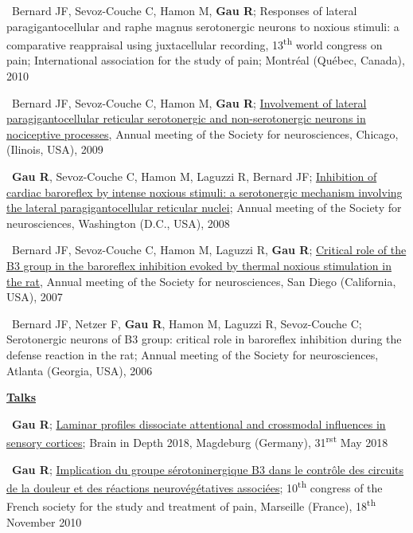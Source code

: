 \documentclass[a4paper,12pt,oneside]{letter}
\begin{document}
{\textbullet~Bernard JF, Sevoz-Couche C, Hamon M, \textbf{Gau R}; Responses of lateral paragigantocellular and raphe magnus serotonergic neurons to noxious stimuli: a comparative reappraisal using juxtacellular recording, 13\textsuperscript{th} world congress on pain; International association for the study of pain; Montréal (Québec, Canada), 2010

\textbullet~Bernard JF, Sevoz-Couche C, Hamon M, \textbf{Gau R}; \href{https://osf.io/efqub/}{Involvement of lateral paragigantocellular reticular serotonergic and non-serotonergic neurons in nociceptive processes}, Annual meeting of the Society for neurosciences, Chicago, (Ilinois, USA), 2009

\textbullet~\textbf{Gau R}, Sevoz-Couche C, Hamon M, Laguzzi R, Bernard JF; \href{https://osf.io/hxkgv/}{Inhibition of cardiac baroreflex by intense noxious stimuli: a serotonergic mechanism involving the lateral paragigantocellular reticular nuclei}; Annual meeting of the Society for neurosciences, Washington (D.C., USA), 2008

\textbullet~Bernard JF, Sevoz-Couche C, Hamon M, Laguzzi R, \textbf{Gau R}; \href{https://osf.io/4rjst/}{Critical role of the B3 group in the baroreflex inhibition evoked by thermal noxious stimulation in the rat}, Annual meeting of the Society for neurosciences, San Diego (California, USA), 2007

\textbullet~Bernard JF, Netzer F, \textbf{Gau R}, Hamon M, Laguzzi R, Sevoz-Couche C; Serotonergic neurons of B3 group: critical role in baroreflex inhibition during the defense reaction in the rat; Annual meeting of the Society for neurosciences, Atlanta (Georgia, USA), 2006


\begin{center}
 \href{https://osf.io/4h63t/}{\large\textbf{Talks}}
\end{center}

\textbullet~\textbf{Gau R}; \href{https://figshare.com/s/06d360f8ec1be9431f6e}{Laminar profiles dissociate attentional and crossmodal influences in sensory cortices}; Brain in Depth 2018, Magdeburg (Germany), 31\textsuperscript{rst} May 2018

\textbullet~\textbf{Gau R}; \href{http://www.researchgate.net/profile/Remi_Gau/publication/312084405_Implication_du_groupe_serotoninergique_B3_dans_le_controle_des_circuits_de_la_douleur_et_des_reactions_neurovegetatives_associees/links/586e5f4a08ae6eb871bcfcc2?origin=publication_detail&ev=pub_int_prw_xdl&msrp=fq7qspniFbcYB53CbrroAtz2DNXxUJar7CmckJaw6O2YzI7LWasFAW99t9G74Z5sL-KLoJT2Dqv8D075R3ghy55Fy6xPne3_ARZvM87O3Ao.5ii75N_9y4vKCns-VUuTTDNhKb6ruhYALqaObgtdOB4WIkUSArh9tdzN9AtPRWz68YGcjTb3scxfWZy6tYxnSg.naSDUCbUZHM6gF6BaFbjpF3ARcyIPTBh1UsuA1cVoOZQsoPMn9YGNC2UsgdGA0P28xoO8bXY1221-tRVtfrUZA}{Implication du groupe sérotoninergique B3 dans le contrôle des circuits de la douleur et des réactions neurovégétatives associées}; 10\textsuperscript{th} congress of the French society for the study and treatment of pain, Marseille (France), 18\textsuperscript{th} November 2010


}
\end{document}
